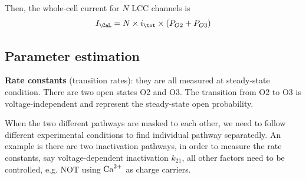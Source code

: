Then, the whole-cell current for $N$ LCC channels is
\begin{equation}
I_\CaL = N \times i_\tot \times (P_{O2}+P_{O3})
\end{equation}

\subsection{Parameter estimation}

{\bf Rate constants} (transition rates): they are all measured at steady-state
condition. There are two open states O2 and O3. The transition from O2 to O3 is
voltage-independent and represent the steady-state open probability.

When the two different pathways are masked to each other, we need to follow
different experimental conditions to find individual pathway separatedly. An
example is there are two inactivation pathways, in order to measure the rate
constants, say voltage-dependent inactivation $k_{21}$, all other factors need
to be controlled, e.g. NOT using ${\text{Ca}^{2+}}$ as charge carriers.

